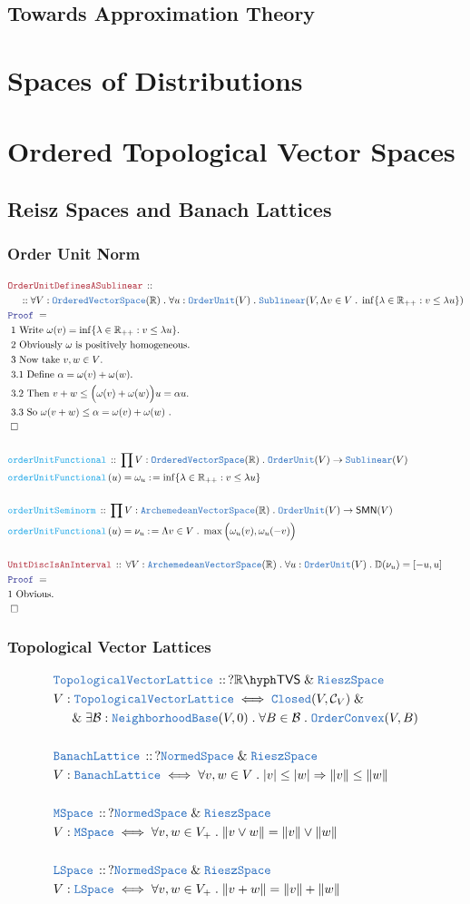 \documentclass[12pt]{scrartcl}
\newcommand{\TYPE}[1]{\textcolor{NavyBlue}{\mathtt{#1}}}
\newcommand{\FUNC}[1]{\textcolor{Cerulean}{\mathtt{#1}}}
\newcommand{\LOGIC}[1]{\textcolor{Blue}{\mathtt{#1}}}
\newcommand{\THM}[1]{\textcolor{Maroon}{\mathtt{#1}}}
\renewcommand{\.}{\; . \;}
\newcommand{\de}{: \kern 0.1pc =}
\newcommand{\Act}[1]{\left( #1 \right)}
\newcommand{\Theorem}[2]{& \THM{#1} \, :: \, #2 \\ & \Proof = \\ }
\newcommand{\DeclareType}[2]{& \TYPE{#1} \, :: \, #2 \\}
\newcommand{\DefineType}[3]{& #1 : \TYPE{#2} \iff #3 \\}
\newcommand{\DeclareFunc}[2]{& \FUNC{#1} \, :: \, #2 \\}
\newcommand{\DefineNamedFunc}[4]{&  \FUNC{#1}\Act{#2} = #3 \de #4 \\}
\newcommand{\NewLine}{\\ & \kern 1pc}
\newcommand{\Page}[1]{ \begin{align*} #1 \end{align*}   }
\newcommand{\Explain}[1]{& \text{#1.} \\}
\renewcommand{\And}{\; \& \;}
\newcommand{\Imply}{\Rightarrow}
\newcommand{\Reals}{\mathbb{R} }
\newcommand{\QED}{\; \square}
\newcommand{\EndProof}{& \QED \\}
\newcommand{\Proof}{\LOGIC{Proof} \; }
\renewcommand{\C}{\mathcal{C}}
\newcommand{\B}{\mathcal{B}}
\newcommand{\NbhdBase}{\TYPE{NeighborhoodBase}}
\newcommand{\Closed}{\TYPE{Closed}}
\newcommand{\Disc}{\mathbb{D}}
\newcommand{\NS}{\TYPE{NormedSpace}}
\newcommand{\OVS}{\TYPE{OrderedVectorSpace}}
\newcommand{\OU}{\TYPE{OrderUnit}}
\newcommand{\AVS}{\TYPE{ArchemedeanVectorSpace}}
\newcommand{\RS}{\TYPE{RieszSpace}}
\newcommand{\TVS}[1]{{#1}\hyph\mathsf{TVS}}
\newcommand{\SMN}{\mathsf{SMN}}
\begin{document}
\subsection{Towards Approximation Theory}
\section{Spaces of Distributions}
\newpage
\section{Ordered Topological Vector Spaces}
\subsection{Reisz Spaces and Banach Lattices}
\subsubsection{Order Unit Norm}
\Page{
	\Theorem{OrderUnitDefinesASublinear}
	{
		\NewLine ::		
		\forall V : \OVS(\Reals) \. 
		\forall u : \OU(V) \.
		\TYPE{Sublinear}(V, \Lambda v \in V \. \inf \{ \lambda \in \Reals_{++} : v \le \lambda u \} )
	}
	\Explain{ 1 Write $\omega(v) = \inf \{ \lambda \in \Reals_{++} : v \le \lambda u \}$}
	\Explain{ 2 Obviously $\omega$ is positively homogeneous}
	\Explain{ 3 Now take $v,w \in V$}
	\Explain{ 3.1 Define $\alpha = \omega(v) + \omega(w)$}
	\Explain{ 3.2 Then $ v + w \le \Big(\omega(v) + \omega(w)\Big)u = \alpha u$}
	\Explain{ 3.3 So $\omega(v + w) \le \alpha = \omega(v) + \omega(w)$ }
	\EndProof
	\\
	\DeclareFunc{orderUnitFunctional}
	{
		\prod V : \OVS(\Reals) \. 
		\OU(V) \to \TYPE{Sublinear}(V)
	}
	\DefineNamedFunc{orderUnitFunctional}{u}{\omega_u}
	{\inf \{ \lambda \in \Reals_{++} : v \le \lambda u \}}
	\\
	\DeclareFunc{orderUnitSeminorm}
	{
		\prod V : \AVS(\Reals) \. 
		\OU(V) \to \SMN(V)
	}
	\DefineNamedFunc{orderUnitFunctional}{u}{\nu_u}
	{\Lambda v \in V \. \max\Big(\omega_u(v),\omega_u(-v)\Big)}
	\\
	\Theorem{UnitDiscIsAnInterval}
	{
		\forall V : \AVS(\Reals) \.
		\forall u : \OU(V) \.
		\Disc(\nu_u) = [-u,u] 
	}
	\Explain{1 Obvious}
	\EndProof
}
\newpage
\subsubsection{Topological Vector Lattices}
\Page{
	\DeclareType{TopologicalVectorLattice}
	{
		? \TVS{\Reals} \And \RS
	}
	\DefineType{V}{TopologicalVectorLattice}
	{
		\Closed(V,\C_V) \And \NewLine \And 
		\exists \B : \NbhdBase(V,0) \.
		\forall B \in \B \.
		\TYPE{OrderConvex}(V,B) 
	}
	\\
	\DeclareType{BanachLattice}
	{
		? \NS \And \RS
	}
	\DefineType{V}{BanachLattice}
	{
		\forall v,w \in V \. 
		|v| \le |w| \Imply \|v\| \le \|w\|  
	}
	\\
	\DeclareType{MSpace}
	{
		? \NS \And \RS
	}
	\DefineType{V}{MSpace}
	{
		\forall v,w \in V_+ \. 
		\| v \vee w \| = \|v\| \vee \|w\|
	}
	\\
	\DeclareType{LSpace}
	{
		? \NS \And \RS
	}
	\DefineType{V}{LSpace}
	{
		\forall v,w \in V_+ \. 
		\| v + w \| = \|v\| + \|w\|
	}
}
\newpage
\end{document}
